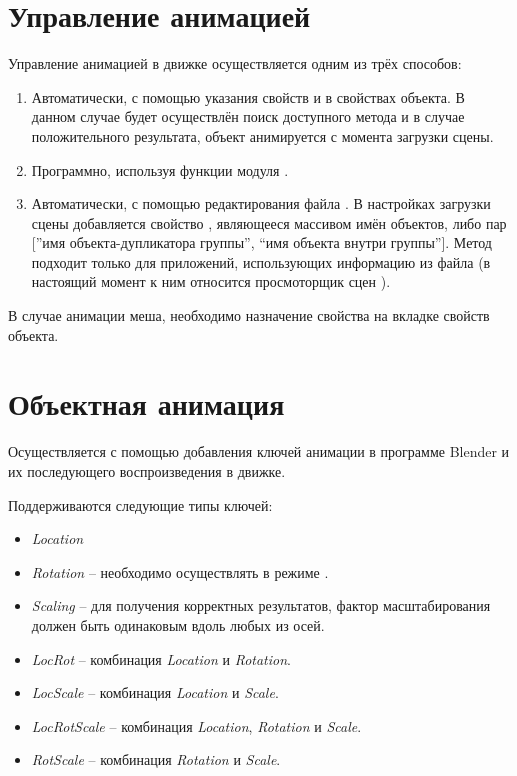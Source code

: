 \documentclass[a4paper,12pt,oneside]{sphinxmanual}
\begin{document}
\section{Управление анимацией}
\label{animation:id2}
Управление анимацией в движке осуществляется одним из трёх способов:
\begin{enumerate}
\item {} 
Автоматически, с помощью указания свойств  и
 в свойствах объекта. В данном случае будет осуществлён
поиск доступного метода и в случае положительного результата, объект
анимируется с момента загрузки сцены.

\item {} 
Программно, используя функции модуля .

\item {} 
Автоматически, с помощью редактирования файла . В настройках
загрузки сцены добавляется свойство , являющееся массивом
имён объектов, либо пар {[}''имя объекта-дупликатора группы'', ``имя объекта
внутри группы''{]}. Метод подходит только для приложений, использующих
информацию из файла  (в настоящий момент к ним относится
просмоторщик сцен ).

\end{enumerate}

В случае анимации меша, необходимо назначение свойства  на
вкладке свойств объекта.


\section{Объектная анимация}
\label{animation:id3}
Осуществляется с помощью добавления ключей анимации в программе Blender и
их последующего воспроизведения в движке.

Поддерживаются следующие типы ключей:
\begin{itemize}
\item {} 
\emph{Location}

\item {} 
\emph{Rotation} -- необходимо осуществлять в режиме .

\item {} 
\emph{Scaling} -- для получения корректных результатов, фактор масштабирования должен быть одинаковым вдоль любых из осей.

\item {} 
\emph{LocRot} -- комбинация \emph{Location} и \emph{Rotation}.

\item {} 
\emph{LocScale} -- комбинация \emph{Location} и \emph{Scale}.

\item {} 
\emph{LocRotScale} -- комбинация \emph{Location}, \emph{Rotation} и \emph{Scale}.

\item {} 
\emph{RotScale} -- комбинация \emph{Rotation} и \emph{Scale}.

\end{itemize}
\end{document}
